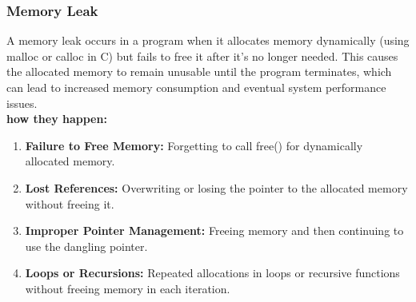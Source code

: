 \documentclass{article}
\begin{document}
        \subsubsection{Memory Leak}
        A memory leak occurs in a program when it allocates memory dynamically (using malloc or calloc in C) but fails to free it after it's no longer needed. This causes the allocated memory to remain unusable until the program terminates, which can lead to increased memory consumption and eventual system performance issues.
        \\\textbf{how they happen:}
        \begin{enumerate}
            \item \textbf{Failure to Free Memory:} Forgetting to call free() for dynamically allocated memory.
            \item \textbf{Lost References:} Overwriting or losing the pointer to the allocated memory without freeing it.
            \item \textbf{Improper Pointer Management:} Freeing memory and then continuing to use the dangling pointer.
            \item \textbf{Loops or Recursions:} Repeated allocations in loops or recursive functions without freeing memory in each iteration.
        \end{enumerate}
\end{document}
